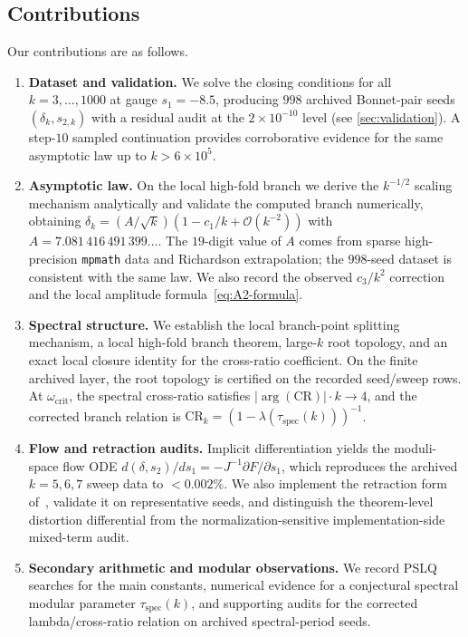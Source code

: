 \documentclass[11pt,a4paper]{article}
\theoremstyle{plain}
\theoremstyle{definition}
\theoremstyle{remark}
\newcommand{\Oo}{\mathcal{O}}
\begin{document}
\subsection{Contributions}
Our contributions are as follows.
\begin{enumerate}[label=\textbf{C\arabic*}.,nosep]
\item \textbf{Dataset and validation.}
  We solve the closing conditions for all $k=3,\ldots,1000$ at gauge
  $s_1=-8.5$, producing $998$ archived Bonnet-pair seeds
  $(\delta_k,s_{2,k})$ with a residual audit at the
  $2\times10^{-10}$ level (see \cref{sec:validation}).  A step-$10$ sampled
  continuation provides corroborative evidence for the same asymptotic
  law up to $k>6\times 10^5$.
\item \textbf{Asymptotic law.}
  On the local high-fold branch we derive the $k^{-1/2}$ scaling
  mechanism analytically and validate the computed branch numerically,
  obtaining $\delta_k=(A/\sqrt{k})(1-c_1/k+\Oo(k^{-2}))$ with
  $A=7.081\,416\,491\,399\ldots$.  The $19$-digit value of $A$ comes
  from sparse high-precision \texttt{mpmath} data and Richardson
  extrapolation; the $998$-seed dataset is consistent with the same
  law.  We also record the observed $c_3/k^2$ correction and the local
  amplitude formula~\eqref{eq:A2-formula}.
\item \textbf{Spectral structure.}
  We establish the local branch-point splitting mechanism, a local
  high-fold branch theorem, large-$k$ root topology, and an exact local
  closure identity for the cross-ratio coefficient.  On the finite
  archived layer, the root topology is certified on the recorded
  seed/sweep rows.  At $\omega_{\mathrm{crit}}$, the spectral
  cross-ratio satisfies $\lvert\arg(\mathrm{CR})\rvert\cdot k\to4$,
  and the corrected branch relation is
  $\mathrm{CR}_k=(1-\lambda(\tau_{\mathrm{spec}}(k)))^{-1}$.
\item \textbf{Flow and retraction audits.}
  Implicit differentiation yields the moduli-space flow ODE
  $d(\delta,s_2)/ds_1=-J^{-1}\partial F/\partial s_1$, which
  reproduces the archived $k=5,6,7$ sweep data to $<0.002\%$.  We also
  implement the retraction form of~\cite{BCHR25}, validate it on
  representative seeds, and distinguish the theorem-level distortion
  differential from the normalization-sensitive implementation-side
  mixed-term audit.
\item \textbf{Secondary arithmetic and modular observations.}
  We record PSLQ searches for the main constants,
  numerical evidence for a conjectural spectral modular parameter
  $\tau_{\mathrm{spec}}(k)$, and supporting audits for the corrected
  lambda/cross-ratio relation on archived spectral-period seeds.
\end{enumerate}
\end{document}
